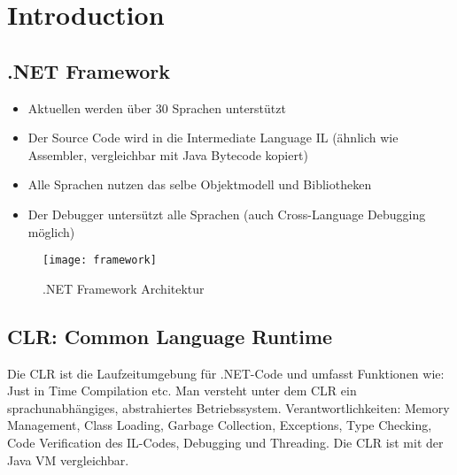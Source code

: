 
\section{Introduction}

\subsection{.NET Framework}
\begin{itemize}
  \itemsep 0em 
  \item Aktuellen werden über 30 Sprachen unterstützt
  \item Der Source Code wird in die Intermediate Language IL (ähnlich wie Assembler, vergleichbar mit Java Bytecode kopiert)
  \item Alle Sprachen nutzen das selbe Objektmodell und Bibliotheken
  \item Der Debugger untersützt alle Sprachen (auch Cross-Language Debugging möglich)
\end{itemize}

\begin{figure}[h!]
	\centering
	\texttt{[image: framework]}
    \caption{.NET Framework Architektur}
\end{figure}

\subsection{CLR: Common Language Runtime}
Die CLR ist die Laufzeitumgebung für .NET-Code und umfasst Funktionen wie: Just in Time Compilation etc. Man versteht unter dem CLR ein sprachunabhängiges, abstrahiertes Betriebssystem. Verantwortlichkeiten: Memory Management, Class Loading, Garbage Collection, Exceptions, Type Checking, Code Verification des IL-Codes, Debugging und Threading. Die CLR ist mit der Java VM vergleichbar.

